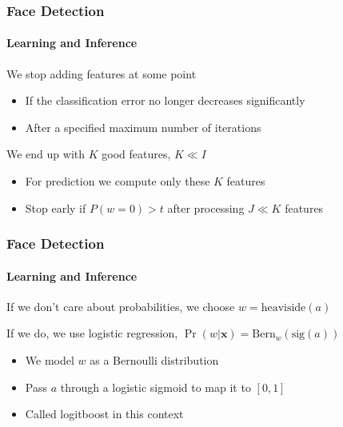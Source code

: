 \documentclass[xetex,professionalfont]{beamer}
\renewcommand{\vec}[1]{\ensuremath{\mathbf{#1}}}
\newcommand{\vx}{\vec{x}}
\renewcommand\emph[1]{\textcolor{tuwcvl_inf_red}{#1}}
\begin{document}
\begin{frame}
\frametitle{Face Detection}
\framesubtitle{Learning and Inference}

We stop adding features at some point
\begin{itemize}
    \item If the classification error no longer decreases significantly
    \item After a specified maximum number of iterations
\end{itemize}

\bigskip
We end up with $K$ good features, $K\ll I$
\begin{itemize}
    \item For prediction we compute only these $K$ features
    \item Stop early if $P(w=0)>t$ after processing $J\ll K$ features %
\end{itemize}

\end{frame}


\begin{frame}
\frametitle{Face Detection}
\framesubtitle{Learning and Inference}

If we don't care about probabilities, we choose $w=\text{heaviside}(a)$

\bigskip
If we do, we use \emph{logistic regression}, $\Pr(w|\vx)=\text{Bern}_w(\text{sig}(a))$
\begin{itemize}
    \item We model $w$ as a Bernoulli distribution
    \item Pass $a$ through a logistic sigmoid to map it to $[0,1]$
    \item Called \emph{logitboost} in this context
\end{itemize}

\end{frame}

\end{document}
